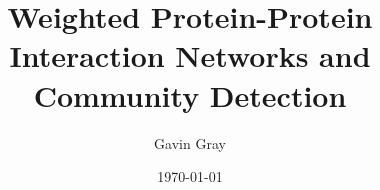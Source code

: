 \documentclass[12pt,oneside,abbrevs,dtc,mscres,neuro,notimes,logo]{styles/infthesis}
\title{Weighted Protein-Protein Interaction Networks and Community Detection}
\author{Gavin Gray}
\date{\today}
\begin{document}



  \begin{preliminary}
    \maketitle

    
    \standarddeclaration
    
    \tableofcontents
    \listoffigures
  \end{preliminary}

  
  
  
  
  

  \appendix

  
  

  \printbibliography
\end{document}
